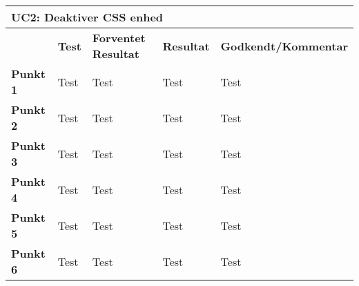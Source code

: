 \begin{table}[htbp] \centering
\begin{tabular}{|l|l|l|l|l|} %
	\hline
\multicolumn{5}{|l|}{\textbf{UC2: Deaktiver CSS enhed}} \\\hline
	&\textbf{Test} &\textbf{Forventet Resultat} &\textbf{Resultat} &\textbf{Godkendt/Kommentar} \\\hline
\textbf{Punkt 1}		&Test	&Test 	&Test	&Test \\\hline
\textbf{Punkt 2}		&Test	&Test 	&Test	&Test \\\hline
\textbf{Punkt 3}		&Test	&Test 	&Test	&Test \\\hline
\textbf{Punkt 4}		&Test	&Test 	&Test	&Test \\\hline
\textbf{Punkt 5}		&Test	&Test 	&Test	&Test \\\hline
\textbf{Punkt 6}		&Test	&Test 	&Test	&Test \\\hline
	\end{tabular}
	\label{ATUC2} 
\end{table}